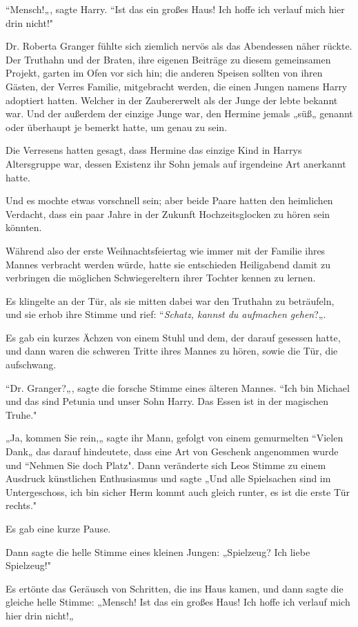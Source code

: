 {“Mensch!„, sagte Harry. “Ist das ein großes Haus! Ich hoffe ich verlauf mich hier drin nicht!"

Dr. Roberta Granger fühlte sich ziemlich nervös als das Abendessen näher rückte. Der Truthahn und der Braten, ihre eigenen Beiträge zu diesem gemeinsamen Projekt, garten im Ofen vor sich hin; die anderen Speisen sollten von ihren Gästen, der Verres Familie, mitgebracht werden, die einen Jungen namens Harry adoptiert hatten. Welcher in der Zaubererwelt als der Junge der lebte bekannt war. Und der außerdem der einzige Junge war, den Hermine jemals „süß„ genannt oder überhaupt je bemerkt hatte, um genau zu sein.

Die Verresens hatten gesagt, dass Hermine das einzige Kind in Harrys Altersgruppe war, dessen Existenz ihr Sohn jemals auf irgendeine Art anerkannt hatte.

Und es mochte etwas vorschnell sein; aber beide Paare hatten den heimlichen Verdacht, dass ein paar Jahre in der Zukunft Hochzeitsglocken zu hören sein könnten.

Während also der erste Weihnachtsfeiertag wie immer mit der Familie ihres Mannes verbracht werden würde, hatte sie entschieden Heiligabend damit zu verbringen die möglichen Schwiegereltern ihrer Tochter kennen zu lernen.

Es klingelte an der Tür, als sie mitten dabei war den Truthahn zu beträufeln, und sie erhob ihre Stimme und rief: “\emph{Schatz, kannst du aufmachen gehen}?„.

Es gab ein kurzes Ächzen von einem Stuhl und dem, der darauf gesessen hatte, und dann waren die schweren Tritte ihres Mannes zu hören, sowie die Tür, die aufschwang.

“Dr. Granger?„, sagte die forsche Stimme eines älteren Mannes. “Ich bin Michael und das sind Petunia und unser Sohn Harry. Das Essen ist in der magischen Truhe."

„Ja, kommen Sie rein,„ sagte ihr Mann, gefolgt von einem gemurmelten “Vielen Dank„ das darauf hindeutete, dass eine Art von Geschenk angenommen wurde und “Nehmen Sie doch Platz". Dann veränderte sich Leos Stimme zu einem Ausdruck künstlichen Enthusiasmus und sagte „Und alle Spielsachen sind im Untergeschoss, ich bin sicher Herm kommt auch gleich runter, es ist die erste Tür rechts."

Es gab eine kurze Pause.

Dann sagte die helle Stimme eines kleinen Jungen: „Spielzeug? Ich liebe Spielzeug!"

Es ertönte das Geräusch von Schritten, die ins Haus kamen, und dann sagte die gleiche helle Stimme: „Mensch! Ist das ein großes Haus! Ich hoffe ich verlauf mich hier drin nicht!„

}
